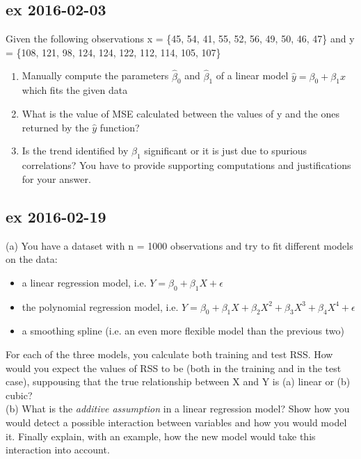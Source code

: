 \documentclass[a4paper,12pt,titlepage]{article} %
\begin{document}
\subsection{ex 2016-02-03}
Given the following observations x = \{45, 54, 41, 55, 52, 56, 49, 50, 46, 47\} and y = \{108, 121, 98, 124, 124, 122, 112, 114, 105, 107\}
\begin{enumerate}
\item Manually compute the parameters $ \hat{\beta}_{0} $ and $ \hat{\beta}_{1} $ of a linear model $ \hat{y} = \beta_{0} + \beta_{1} x $ which fits the given data
\item What is the value of MSE calculated between the values of y and the ones returned by the $ \hat{y} $ function?
\item Is the trend identified by $ \hat{\beta}_{1} $ significant or it is just due to spurious correlations? You have to provide supporting computations and justifications for your answer. 
\end{enumerate}

\subsection{ex 2016-02-19}
(a) You have a dataset with n = 1000 observations and try to fit different models on the data:
\begin{itemize}
\item a linear regression model, i.e. $ Y = \beta_{0} + \beta_{1} X + \epsilon $
\item the polynomial regression model, i.e. $ Y = \beta_{0} + \beta_{1} X + \beta_{2} X^{2} + \beta_{3} X^{3} + \beta_{4} X^{4} + \epsilon $
\item a smoothing spline (i.e. an even more flexible model than the previous two)
\end{itemize}

For each of the three models, you calculate both training and test RSS. How would you expect the values of RSS to be (both in the training and in the test case), suppousing that the true relationship between X and Y is (a) linear or (b) cubic?\\

(b) What is the \textit{additive assumption} in a linear regression model? Show how you would detect a possible interaction between variables and how you would model it. Finally explain, with an example, how the new model would take this interaction into account.

\newpage
\end{document}
